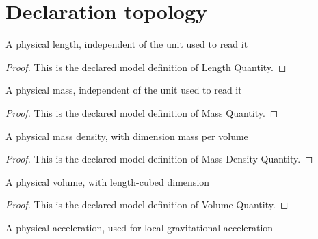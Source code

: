 \section{Declaration topology}
\begin{definition}
  \label{def:physics:phyx-mini-0407:phyxminiproblems-problemphyxmini0407-lengthquantity}
  A physical length, independent of the unit used to read it
\end{definition}
\begin{proof}
  This is the declared model definition of Length Quantity.
\end{proof}
\begin{definition}
  \label{def:physics:phyx-mini-0407:phyxminiproblems-problemphyxmini0407-massquantity}
  A physical mass, independent of the unit used to read it
\end{definition}
\begin{proof}
  This is the declared model definition of Mass Quantity.
\end{proof}
\begin{definition}
  \label{def:physics:phyx-mini-0407:phyxminiproblems-problemphyxmini0407-massdensityquantity}
  A physical mass density, with dimension mass per volume
\end{definition}
\begin{proof}
  This is the declared model definition of Mass Density Quantity.
\end{proof}
\begin{definition}
  \label{def:physics:phyx-mini-0407:phyxminiproblems-problemphyxmini0407-volumequantity}
  A physical volume, with length-cubed dimension
\end{definition}
\begin{proof}
  This is the declared model definition of Volume Quantity.
\end{proof}
\begin{definition}
  \label{def:physics:phyx-mini-0407:phyxminiproblems-problemphyxmini0407-accelerationquantity}
  A physical acceleration, used for local gravitational acceleration
\end{definition}
